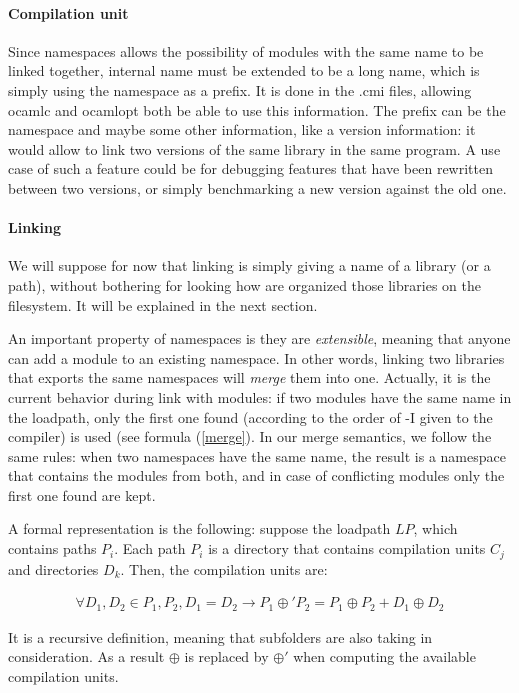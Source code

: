 \paragraph{Compilation unit}

Since namespaces allows the possibility of modules with the same name to be
linked together, internal name must be extended to be a long name, which is simply
using the namespace as a prefix. It is done in the .cmi files, allowing ocamlc
and ocamlopt both be able to use this information. The prefix can be the
namespace and maybe some other information, like a version information: it would
allow to link two versions of the same library in the same program. A use case
of such a feature could be for debugging features that have been rewritten
between two versions, or simply benchmarking a new version against the old one.


\paragraph{Linking} We will suppose for now that linking is simply giving a name
of a library (or a path), without bothering for looking how are organized those
libraries on the filesystem. It will be explained in the next section.

An important property of namespaces is they are \emph{extensible}, meaning that
anyone can add a module to an existing namespace. In other words, linking two
libraries that exports the same namespaces will \emph{merge} them into
one. Actually, it is the current behavior during link with modules: if two
modules have the same name in the loadpath, only the first one found (according
to the order of -I given to the compiler) is used (see formula (\ref{merge}). In
our merge semantics, we follow the same rules: when two namespaces have the same
name, the result is a namespace that contains the modules from both, and in case
of conflicting modules only the first one found are kept.

A formal representation is the following: suppose the loadpath $LP$, which
contains paths $P_i$. Each path $P_i$ is a directory that contains compilation
units $C_j$ and directories $D_k$. Then, the compilation units are:

\begin{multline}
\forall D_1, D_2 \in P_1, P_2, D_1 = D_2
\rightarrow P_1 \oplus' P_2 = P_1 \oplus P_2 + D_1 \oplus D_2
\label{ns-merge} 
\end{multline}

It is a recursive definition, meaning that subfolders are also taking in
consideration. As a result $\oplus$ is replaced by $\oplus'$ when computing the
available compilation units.

